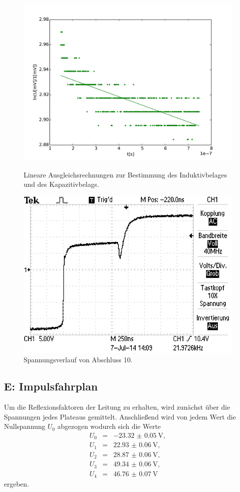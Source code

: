 \begin{figure}
	\centering
	\includegraphics[width = 14cm]{data/d/Regression3.pdf}
	\caption{Lineare Ausgleichsrechnungen zur Bestimmung des Induktivbelages und des Kapazitivbelags.}
	\includegraphics[width = 12cm]{data/d/F0007TEK.JPG}
	\caption{Spannungsverlauf von Abschluss 10.}
	\label{fig_abs10}
\end{figure}

\FloatBarrier
\subsection{E: Impulsfahrplan} %
\label{sub:subsection_name}

Um die Reflexionsfaktoren der Leitung zu erhalten, wird zunächst über die Spannungen jedes Plateaus gemittelt.
Anschließend wird von jedem Wert die Nullspannung $U_0$ abgezogen wodurch sich die Werte
\begin{eqnarray*}
	U_0 &=& \SI{-23.32(5)}{\volt},\\
	U_1 &=& \SI{22.93(6)}{\volt},\\
	U_2 &=& \SI{28.87(6)}{\volt},\\
	U_3 &=& \SI{49.34(6)}{\volt},\\
	U_4 &=& \SI{46.76(7)}{\volt}
\end{eqnarray*}
ergeben.


